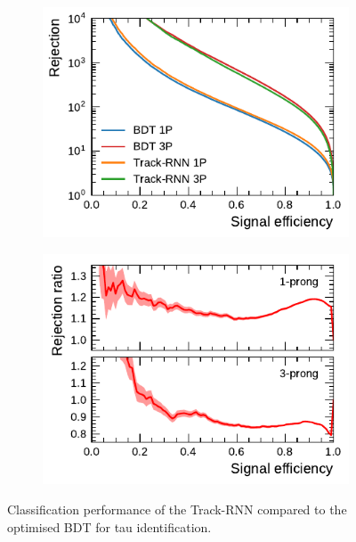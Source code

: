 \begin{figure}[ht]
  \begin{subfigure}[t]{0.48\textwidth}
    \centering
    \includegraphics{./figures/rnn/track/roc.pdf}
  \end{subfigure}\hfill
  \begin{subfigure}[t]{0.48\textwidth}
    \centering
    \includegraphics{./figures/rnn/track/ratios.pdf}
  \end{subfigure}
  \caption{Classification performance of the Track-RNN compared to the optimised
    BDT for tau identification.}
  \label{fig:track_rnn_roc_ratios}
\end{figure}

